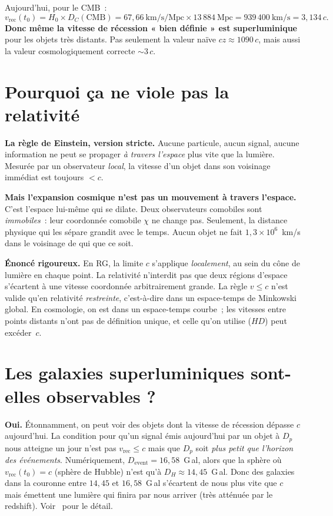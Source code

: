 \documentclass[11pt,a4paper,openany]{report}
\newcommand{\Mpc}{\text{Mpc}}
\newcommand{\Hzero}{H_{0}}
\begin{document}
Aujourd'hui, pour le CMB~:
\[
v_{\text{rec}}(t_0) = \Hzero \times D_C(\text{CMB})
   = 67{,}66~\text{km/s/Mpc} \times 13\,884~\Mpc
   = 939\,400~\text{km/s} = 3{,}134\,c.
\]
\textbf{Donc même la vitesse de récession « bien définie » est superluminique}
pour les objets très distants. Pas seulement la valeur naïve $cz \approx
1090\,c$, mais aussi la valeur cosmologiquement correcte $\sim 3\,c$.

\section{Pourquoi ça ne viole pas la relativité}

\begin{tcolorbox}[vulgarisation]
\textbf{La règle de Einstein, version stricte.} Aucune particule, aucun
signal, aucune information ne peut se propager \emph{à travers l'espace}
plus vite que la lumière. Mesurée par un observateur \emph{local}, la
vitesse d'un objet dans son voisinage immédiat est toujours $<c$.

\medskip
\textbf{Mais l'expansion cosmique n'est pas un mouvement à travers
l'espace.} C'est l'espace lui-même qui se dilate. Deux observateurs comobiles
sont \emph{immobiles}~: leur coordonnée comobile $\chi$ ne change pas.
Seulement, la distance physique qui les sépare grandit avec le temps. Aucun
objet ne fait $1{,}3\times 10^{6}$~km/s dans le voisinage de qui que ce
soit.
\end{tcolorbox}

\begin{tcolorbox}[mathspe]
\textbf{Énoncé rigoureux.} En RG, la limite $c$ s'applique \emph{localement},
au sein du cône de lumière en chaque point. La relativité n'interdit pas que
deux régions d'espace s'écartent à une vitesse coordonnée arbitrairement
grande. La règle $v\le c$ n'est valide qu'en relativité \emph{restreinte},
c'est-à-dire dans un espace-temps de Minkowski global. En cosmologie, on est
dans un espace-temps courbe~; les vitesses entre points distants n'ont pas
de définition unique, et celle qu'on utilise ($H D$) peut excéder~$c$.
\end{tcolorbox}

\section{Les galaxies superluminiques sont-elles observables ?}

\textbf{Oui.} Étonnamment, on peut voir des objets dont la vitesse de
récession dépasse $c$ aujourd'hui. La condition pour qu'un signal émis
aujourd'hui par un objet à $D_p$ nous atteigne un jour n'est pas $v_{\text{rec}}
\le c$ mais que $D_p$ soit \emph{plus petit que l'horizon des événements}.
Numériquement, $D_{\text{event}} = 16{,}58$~G\,al, alors que la sphère où
$v_{\text{rec}}(t_0) = c$ (sphère de Hubble) n'est qu'à $D_H \approx
14{,}45$~G\,al. Donc des galaxies dans la couronne entre $14{,}45$ et $16{,}58$~G\,al
s'écartent de nous plus vite que $c$ mais émettent une lumière qui finira par
nous arriver (très atténuée par le redshift). Voir~\cite{Davis2004} pour
le détail.
\end{document}
